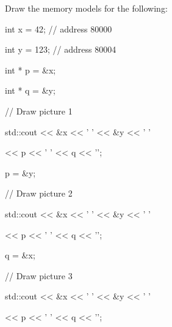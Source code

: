 Draw the memory models for the following:



\begin{consolethree}[escapeinside=||]

int x = 42;         // address 80000

int y = 123;        // address 80004

int * p = &x;

int * q = &y;

// Draw picture 1



std::cout << &x << ' ' << &y << ' '

          << p << ' ' << q << '\n';

p = &y;

// Draw picture 2

std::cout << &x << ' ' << &y << ' '

          << p << ' ' << q << '\n';

q = &x;

// Draw picture 3

std::cout << &x << ' ' << &y << ' '

          << p << ' ' << q << '\n';

\end{consolethree}

